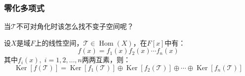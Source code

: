 \subsubsection{零化多项式}
当$\mathcal{T}$不可对角化时该怎么找不变子空间呢？
\begin{theorem}\label{theo:KernelDecompositionCoprimePolynomialFactors}
	设$X$是域$F$上的线性空间，$\mathcal{T}\in\operatorname{Hom}(X)$，在$F[x]$中有：
	\begin{equation*}
		f(x)=f_1(x)f_2(x)\cdots f_n(x)
	\end{equation*}
	其中$f_i(x),\;i=1,2,\dots,n$两两互素，则：
	\begin{equation*}
		\operatorname{Ker}[f(\mathcal{T})]=\operatorname{Ker}[f_1(\mathcal{T})]\oplus\operatorname{Ker}[f_2(\mathcal{T})]\oplus\cdots\oplus\operatorname{Ker}[f_n(\mathcal{T})]
	\end{equation*}
\end{theorem}
